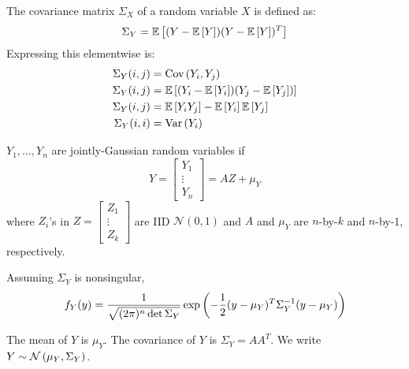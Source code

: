 \begin{definition}
    The covariance matrix $\Sigma_X$ of a random variable $X$ is defined as:
    \[ \Sigma_Y = \mathbb{E}\left[ (Y - \mathbb{E}\left[ Y \right])(Y - \mathbb{E}\left[ Y \right])^T \right] \]
    Expressing this elementwise is:
    \begin{align*}
        \Sigma_Y(i, j) &= \text{Cov}\left( Y_i, Y_j \right) \\
        \Sigma_Y(i, j) &= \mathbb{E}\left[ (Y_i - \mathbb{E}\left[ Y_i \right])(Y_j - \mathbb{E}\left[ Y_j \right]) \right] \\
        \Sigma_Y(i, j) &= \mathbb{E}\left[ Y_i Y_j \right] - \mathbb{E}\left[ Y_i \right] \mathbb{E}\left[ Y_j \right] \\
        \Sigma_Y(i, i) &= \text{Var}\left( Y_i \right)
    \end{align*}
\end{definition}

\begin{definition}
    $Y_1, \dots, Y_n$ are jointly-Gaussian random variables if 
    \[Y = \begin{bmatrix}
        Y_1 \\ \vdots \\ Y_n
    \end{bmatrix} = AZ + \mu_Y\]
    where $Z_i$'s in $Z = \begin{bmatrix}
        Z_1 \\ \vdots \\ Z_k
    \end{bmatrix}$ are IID $\mathcal{N}(0, 1)$ and $A$ and $\mu_Y$ are $n$-by-$k$ and $n$-by-1, respectively.
\end{definition}

\begin{theorem}
    Assuming $\Sigma_Y$ is nonsingular,
    \[ f_Y(y) = \frac{1}{\sqrt{(2 \pi)^n \det \Sigma_Y}} \exp\qty(-\frac{1}{2} (y - \mu_Y)^T \Sigma_Y^{-1} (y - \mu_Y)) \]
\end{theorem}

\begin{theorem}
    The mean of $Y$ is $\mu_Y$. The covariance of $Y$ is $\Sigma_Y = A A^T$. We write $Y \sim \mathcal{N}\left( \mu_Y, \Sigma_Y \right)$.
\end{theorem}

